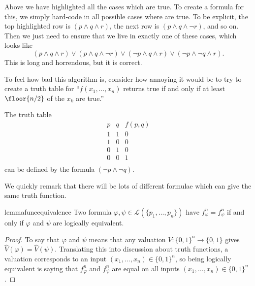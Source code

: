 Above we have highlighted all the cases which are true. To create a formula for this, we simply hard-code in all possible cases where are true. To be explicit, the top highlighted row is $(p\land q\land r)$, the next row is $(p\land q\land\lnot r)$, and so on. Then we just need to ensure that we live in exactly one of these cases, which looks like
\[(p\land q\land r)\lor(p\land q\land\lnot r)\lor(\lnot p\land q\land r)\lor(\lnot p\land\lnot q\land r).\]
This is long and horrendous, but it is correct.
\begin{remark}
	To feel how bad this algorithm is, consider how annoying it would be to try to create a truth table for ``$f(x_1,\ldots,x_n)$ returns true if and only if at least $\floor{n/2}$ of the $x_k$ are true.''
\end{remark}
\begin{example}
	The truth table
	\[\begin{array}{c|c||c}
		p & q & f(p,q) \\
		\hline
		1 & 1 & 0 \\
		1 & 0 & 0 \\
		0 & 1 & 0 \\
		0 & 0 & 1 \\
	\end{array}\]
	can be defined by the formula $(\lnot p\land\lnot q)$.
\end{example}
We quickly remark that there will be lots of different formulae which can give the same truth function.
\begin{restatable}{lemma}{funcequivalence}
	Two formula $\varphi,\psi\in\mathcal L(\{p_1,\ldots,p_n\})$ have $f^n_\varphi=f^n_\psi$ if and only if $\varphi$ and $\psi$ are logically equivalent.
\end{restatable}
\begin{proof}
	To say that $\varphi$ and $\psi$ means that any valuation $V:\{0,1\}^n\to\{0,1\}$ gives $\hat V(\varphi)=\hat V(\psi)$. Translating this into discussion about truth functions, a valuation corresponds to an input $(x_1,\ldots,x_n)\in\{0,1\}^n$, so being logically equivalent is saying that $f^n_\varphi$ and $f^n_\psi$ are equal on all inputs $(x_1,\ldots,x_n)\in\{0,1\}^n$.
\end{proof}